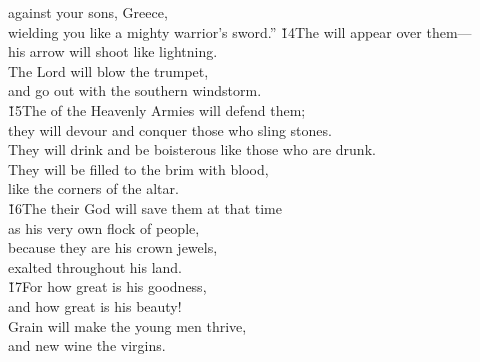 \begin{poetry}
\poemll    against your sons, Greece, \\
\poemlll       wielding you like a mighty warrior's sword.''
\poeml \v{14}The  will appear over them--- \\
\poemll    his arrow will shoot like lightning. \\
\poeml The Lord  will blow the trumpet, \\
\poemll    and go out with the southern windstorm. \\
\poeml \v{15}The  of the Heavenly Armies will defend them; \\
\poemll    they will devour and conquer those who sling stones. \\
\poeml They will drink and be boisterous like those who are drunk. \\
\poemll    They will be filled to the brim with blood, \\
\poemlll       like the corners of the altar. \\
\poeml \v{16}The  their God will save them at that time \\
\poemll    as his very own flock of people, \\
\poeml because they are his crown jewels, \\
\poemll    exalted throughout his land. \\
\poeml \v{17}For how great is his goodness, \\
\poemll    and how great is his beauty! \\
\poeml Grain will make the young men thrive, \\
\poemll    and new wine the virgins.
\end{poetry}

